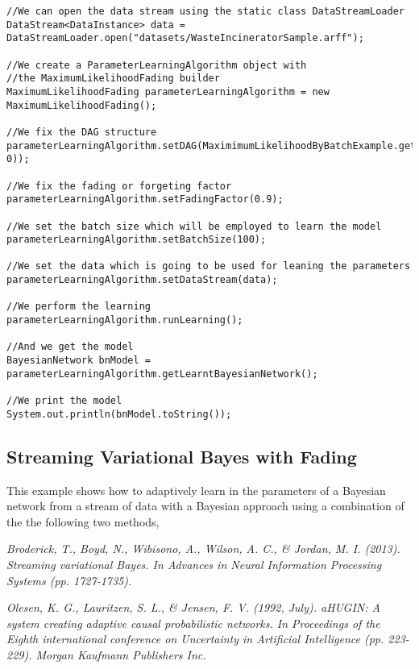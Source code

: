 \begin{lstlisting}
//We can open the data stream using the static class DataStreamLoader
DataStream<DataInstance> data = DataStreamLoader.open("datasets/WasteIncineratorSample.arff");

//We create a ParameterLearningAlgorithm object with 
//the MaximumLikelihoodFading builder
MaximumLikelihoodFading parameterLearningAlgorithm = new MaximumLikelihoodFading();

//We fix the DAG structure
parameterLearningAlgorithm.setDAG(MaximimumLikelihoodByBatchExample.getNaiveBayesStructure(data, 0));

//We fix the fading or forgeting factor
parameterLearningAlgorithm.setFadingFactor(0.9);

//We set the batch size which will be employed to learn the model
parameterLearningAlgorithm.setBatchSize(100);

//We set the data which is going to be used for leaning the parameters
parameterLearningAlgorithm.setDataStream(data);

//We perform the learning
parameterLearningAlgorithm.runLearning();

//And we get the model
BayesianNetwork bnModel = parameterLearningAlgorithm.getLearntBayesianNetwork();

//We print the model
System.out.println(bnModel.toString());
\end{lstlisting}

\subsection{Streaming Variational Bayes with Fading}

This example shows how to adaptively learn in the parameters of a Bayesian network from a stream of data with a Bayesian approach using a combination of the the following two methods,

\textit{Broderick, T., Boyd, N., Wibisono, A., Wilson, A. C., \& Jordan, M. I. (2013). Streaming variational Bayes. 
In Advances in Neural Information Processing Systems (pp. 1727-1735).}

\textit{Olesen, K. G., Lauritzen, S. L., \& Jensen, F. V. (1992, July). aHUGIN: A system creating adaptive causal probabilistic networks. In Proceedings of the Eighth international conference on Uncertainty in Artificial Intelligence (pp. 223-229). Morgan Kaufmann Publishers Inc.}


